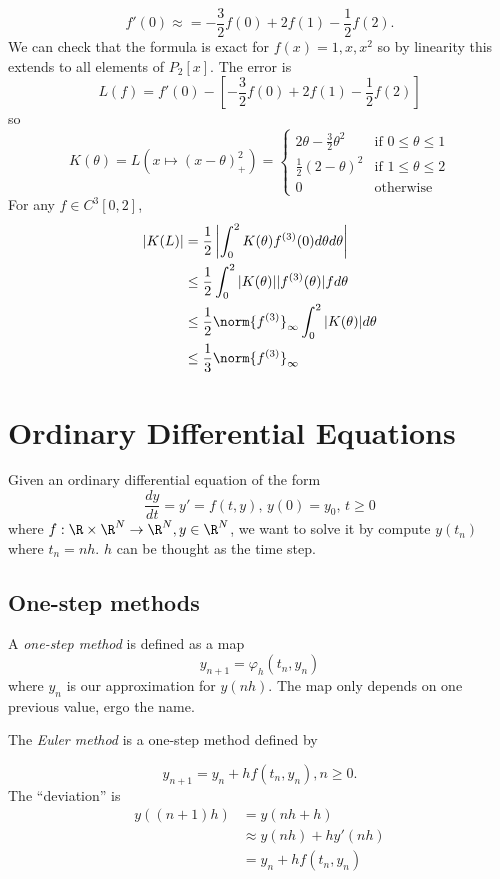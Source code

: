 \documentclass[a4paper]{article}
\begin{document}
\begin{eg}
  \[
    f'(0) \approx = -\frac{3}{2}f(0) + 2f(1) - \frac{1}{2}f(2).
  \]
  We can check that the formula is exact for \(f(x) = 1, x, x^2\) so by linearity this extends to all elements of \(P_2[x]\). The error is
  \[
    L(f) = f'(0) - [-\frac{3}{2}f(0) + 2f(1) - \frac{1}{2}f(2)]
  \]
  so
  \[
    K(\theta) = L(x \mapsto (x - \theta)_+^2) =
    \begin{cases}
      2\theta - \frac{3}{2}\theta^2 & \text{if } 0 \leq \theta \leq 1 \\
      \frac{1}{2}(2 - \theta)^2 & \text{if } 1 \leq \theta \leq 2 \\
      0 & \text{otherwise}
    \end{cases}
  \]
  For any \(f \in C^3[0, 2]\),
  \begin{align*}
    |K(L)|
    &= \frac{1}{2} \left| \int_0^2 K(\theta)f^{(3)}(0)d\theta d\theta \right| \\
    &\leq \frac{1}{2} \int_0^2 |K(\theta)||f^{(3)}(\theta)|fd\theta \\
    &\leq \frac{1}{2} \norm{f^{(3)}}_\infty \int_0^2 |K(\theta)| d\theta \\
    &\leq \frac{1}{3} \norm{f^{(3)}}_\infty
  \end{align*}
\end{eg}

\section{Ordinary Differential Equations}

Given an ordinary differential equation of the form
\[
  \frac{dy}{dt} = y' = f(t, y),\, y(0) = y_0,\, t \geq 0
\]
where \(f: \R \times \R^N \to \R^N, y \in \R^N\), we want to solve it by compute \(y(t_n)\) where \(t_n = nh\). \(h\) can be thought as the time step.

\subsection{One-step methods}

A \emph{one-step method} is defined as a map
\[
  y_{n + 1} = \varphi_h(t_n, y_n)
\]
where \(y_n\) is our approximation for \(y(nh)\). The map only depends on one previous value, ergo the name.

The \emph{Euler method} is a one-step method defined by

\[
  y_{n + 1} = y_n + hf(t_n, y_n), n \geq 0.
\]
The ``deviation'' is
\begin{align*}
  y((n + 1)h)
  &= y(nh + h) \\
  &\approx y(nh) + hy'(nh) \\
  &= y_n + hf(t_n, y_n)
\end{align*}
\end{document}
